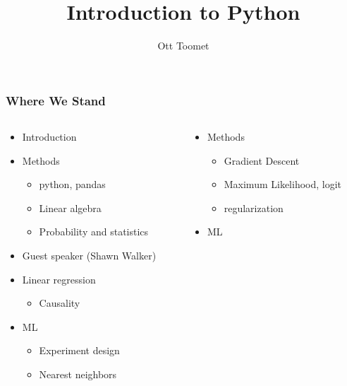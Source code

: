 \documentclass[mathserif, xcolor=table, svgnames]{beamer}
\title[Python]{Introduction to Python}
\author{Ott Toomet}
\begin{document}
\lstset{language=Python}

\begin{frame}
  \maketitle
\end{frame}

\begin{frame}
  \tableofcontents
\end{frame}

\begin{frame}
\frametitle{Where We Stand}
\begin{columns}
  \begin{column}{0.5\linewidth}
    \begin{itemize}
    \item Introduction
    \item Methods
      \begin{itemize}
      \item \alert{python}, \alert{pandas}
      \item Linear algebra
      \item Probability and statistics
      \end{itemize}
    \item Guest speaker (Shawn Walker)
    \item Linear regression
      \begin{itemize}
      \item Causality
      \end{itemize}
    \item ML
      \begin{itemize}
      \item Experiment design
      \item Nearest neighbors
      \end{itemize}
    \end{itemize}
  \end{column}
  \begin{column}{0.5\linewidth}
    \begin{itemize}
    \item Methods
      \begin{itemize}
      \item Gradient Descent 
      \item Maximum Likelihood, logit
      \item regularization
      \end{itemize}
    \item ML

\end{itemize}
\end{column}
\end{columns}
\end{frame}
\end{document}
